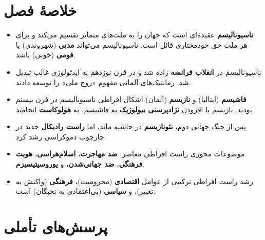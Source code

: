 \section*{خلاصهٔ فصل}

\begin{tcolorbox}[
    enhanced,
    colback=lightbg,
    colframe=darkgray,
    boxrule=2pt,
    arc=8pt,
    fonttitle=\bfseries\large,
    title={\rl{📝 خلاصهٔ فصل دوازدهم}}
]
\begin{itemize}
    \item \textbf{ناسیونالیسم} عقیده‌ای است که جهان را به ملت‌های متمایز تقسیم می‌کند و برای هر ملت حق خودمختاری قائل است. ناسیونالیسم می‌تواند \textbf{مدنی} (شهروندی) یا \textbf{قومی} (خونی) باشد.
    
    \item ناسیونالیسم در \textbf{انقلاب فرانسه} زاده شد و در قرن نوزدهم به ایدئولوژی غالب تبدیل شد. رمانتیک‌های آلمانی مفهوم «روح ملی» را توسعه دادند.
    
    \item \textbf{فاشیسم} (ایتالیا) و \textbf{نازیسم} (آلمان) اشکال افراطی ناسیونالیسم در قرن بیستم بودند. نازیسم با افزودن \textbf{نژادپرستی بیولوژیک} به فاشیسم، به \textbf{هولوکاست} انجامید.
    
    \item پس از جنگ جهانی دوم، \textbf{نئونازیسم} در حاشیه ماند، اما \textbf{راست رادیکال} جدید در چارچوب دموکراسی رشد کرد.
    
    \item موضوعات محوری راست افراطی معاصر: \textbf{ضد مهاجرت}، \textbf{اسلام‌هراسی}، \textbf{هویت فرهنگی}، \textbf{ضد جهانی‌شدن}، و \textbf{یوروسپتیسیزم}.
    
    \item رشد راست افراطی ترکیبی از عوامل \textbf{اقتصادی} (محرومیت)، \textbf{فرهنگی} (واکنش به تغییر)، و \textbf{سیاسی} (بی‌اعتمادی به نخبگان) است.
\end{itemize}
\end{tcolorbox}

\section*{پرسش‌های تأملی}

